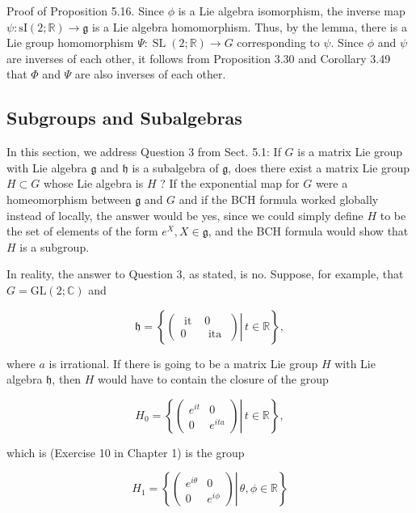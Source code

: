 \documentclass[10pt, letterpaper]{article}
\begin{document}
Proof of Proposition 5.16. Since $\phi$ is a Lie algebra isomorphism, the inverse map $\psi: \mathrm{sI}(2 ; \mathbb{R}) \rightarrow \mathfrak{g}$ is a Lie algebra homomorphism. Thus, by the lemma, there is a Lie group homomorphism $\Psi: \operatorname{SL}(2 ; \mathbb{R}) \rightarrow G$ corresponding to $\psi$. Since $\phi$ and $\psi$ are inverses of each other, it follows from Proposition 3.30 and Corollary 3.49 that $\Phi$ and $\Psi$ are also inverses of each other.

\subsection*{Subgroups and Subalgebras}
In this section, we address Question 3 from Sect. 5.1: If $G$ is a matrix Lie group with Lie algebra $\mathfrak{g}$ and $\mathfrak{h}$ is a subalgebra of $\mathfrak{g}$, does there exist a matrix Lie group $H \subset G$ whose Lie algebra is $H$ ? If the exponential map for $G$ were a homeomorphism between $\mathfrak{g}$ and $G$ and if the BCH formula worked globally instead of locally, the answer would be yes, since we could simply define $H$ to be the set of elements of the form $e^{X}, X \in \mathfrak{g}$, and the BCH formula would show that $H$ is a subgroup.

In reality, the answer to Question 3, as stated, is no. Suppose, for example, that $G=\mathrm{GL}(2 ; \mathbb{C})$ and

$$
\mathfrak{h}=\left\{\left.\left(\begin{array}{cc}
\text { it } & 0 \\
0 & \text { ita }
\end{array}\right) \right\rvert\, t \in \mathbb{R}\right\},
$$

where $a$ is irrational. If there is going to be a matrix Lie group $H$ with Lie algebra $\mathfrak{h}$, then $H$ would have to contain the closure of the group

$$
H_{0}=\left\{\left.\left(\begin{array}{cc}
e^{i t} & 0 \\
0 & e^{i t a}
\end{array}\right) \right\rvert\, t \in \mathbb{R}\right\},
$$

which is (Exercise 10 in Chapter 1) is the group

$$
H_{1}=\left\{\left.\left(\begin{array}{cc}
e^{i \theta} & 0 \\
0 & e^{i \phi}
\end{array}\right) \right\rvert\, \theta, \phi \in \mathbb{R}\right\}
$$
\end{document}
